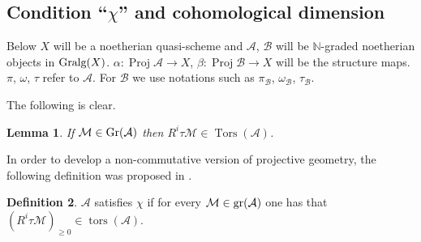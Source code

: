 \documentclass{amsproc}
\def \NN{{\mathbb N}}
\def\Ascr{{\mathcal A}}
\def\Bscr{{\mathcal B}}
\def\Mscr{{\mathcal M}}
\def\gr{\mathop{\text{gr}}}
\def\Gr{\mathop{\text{Gr}}}
\def\Gralg{\mathop{\text{Gralg}}}
\def\tors{\operatorname{tors}}
\def\Tors{\operatorname{Tors}}
\def\gr{\operatorname {gr}}
\def\gr{\operatorname {gr}}
\def\tors{\operatorname {tors}}
\def\Proj{\operatorname {Proj}}
\def\Tors{\operatorname {Tors}}
\def\r{\rightarrow}
\let\oldtext\text
\def\text#1{\oldtext{\upshape #1}}
\newtheorem{lemmas}{Lemma}[subsection]
\theoremstyle{definition}
\newtheorem{definitions}[lemmas]{Definition}
\theoremstyle{remark}
\numberwithin{equation}{section}
\numberwithin{table}{section}
\numberwithin{figure}{section}
\def\gr{\mathop{\text{gr}}}
\def\Gr{\mathop{\text{Gr}}}
\begin{document}
\subsection[Condition  ``$\chi$'' and cohomological   dimension]{Condition
{ ``$\chi$''} and cohomological   dimension} 
\label{ref:3.9b}
Below $X$ will be a noetherian quasi-scheme and $\Ascr$,
$\Bscr$ will be $\NN$-graded noetherian objects in $\Gralg(X)$.
$\alpha:\Proj \Ascr\r X$, $\beta:\Proj \Bscr\r X$ will be the
structure maps. $\pi$, $\omega$, $\tau$ refer to $\Ascr$. For $\Bscr$
we use notations such as $\pi_\Bscr$, $\omega_\Bscr$, $\tau_\Bscr$.

The following is clear.
\begin{lemmas}
\label{ref:3.9.1a}
If $\Mscr\in\Gr(\Ascr)$ then $R^i\tau\Mscr\in\Tors(\Ascr)$.
\end{lemmas}
In order to develop a non-commutative version of projective
geometry, the following definition was proposed in \cite{AZ}.
\begin{definitions}  $\Ascr$ satisfies
  $\chi$ if for every $\Mscr\in \gr(\Ascr)$ one has that 
$(R^i\tau\Mscr)_{\ge 0}\in \tors(\Ascr)$.
\end{definitions}
\end{document}
